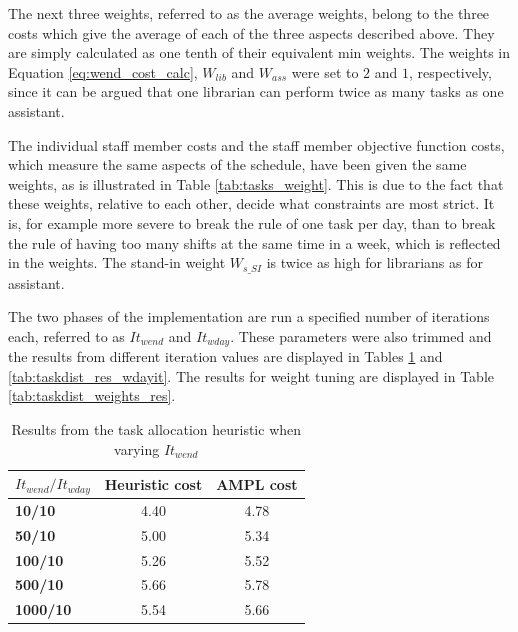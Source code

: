 The next three weights, referred to as the average weights, belong to the three costs which give the average of each of the three aspects described above. They are simply calculated as one tenth of their equivalent min weights. The weights in Equation \ref{eq:wend_cost_calc}, $W_{lib}$ and $W_{ass}$ were set to $2$ and $1$, respectively, since it can be argued that one librarian can perform twice as many tasks as one assistant.

The individual staff member costs and the staff member objective function costs, which measure the same aspects of the schedule, have been given the same weights, as is illustrated in Table \ref{tab:tasks_weight}. This is due to the fact that these weights, relative to each other, decide what constraints are most strict. It is, for example more severe to break the rule of one task per day, than to break the rule of having too many shifts at the same time in a week, which is reflected in the weights. The stand-in weight $W_{s\_SI}$ is twice as high for librarians as for assistant.

The two phases of the implementation are run a specified number of iterations each, referred to as $It_{wend}$ and $It_{wday}$. These parameters were also trimmed and the results from different iteration values are displayed in Tables \ref{tab:taskdist_res_wendit} and \ref{tab:taskdist_res_wdayit}. The results for weight tuning are displayed in Table \ref{tab:taskdist_weights_res}.

\begin{table}[!h]
\centering
\caption{Results from the task allocation heuristic when varying $It_{wend}$}
\label{tab:taskdist_res_wendit}
\begin{tabular}{|l|l|l|}
\hline
\rowcolor{Gray} \textbf{$It_{wend}/It_{wday}$} &  \textbf{Heuristic cost} &  \textbf{AMPL cost} \\ \hline
\cellcolor{Gray} \textbf{10/10} & \multicolumn{1}{c|}{4.40} & \multicolumn{1}{c|}{4.78} \\
\cellcolor{Gray} \textbf{50/10} & \multicolumn{1}{c|}{5.00} & \multicolumn{1}{c|}{5.34} \\
\cellcolor{Gray} \textbf{100/10} & \multicolumn{1}{c|}{5.26} & \multicolumn{1}{c|}{5.52} \\
\cellcolor{Gray} \textbf{500/10} & \multicolumn{1}{c|}{5.66} & \multicolumn{1}{c|}{5.78} \\
\cellcolor{Gray} \textbf{1000/10} & \multicolumn{1}{c|}{5.54} & \multicolumn{1}{c|}{5.66}  \\
\hline
\end{tabular}
\end{table}

